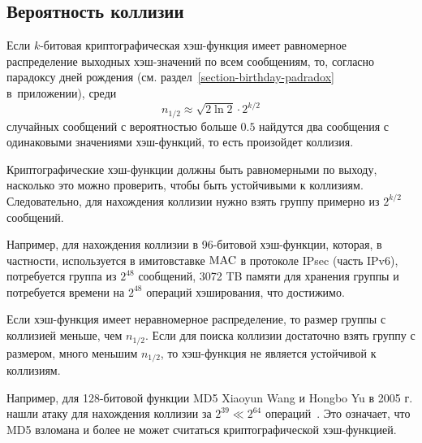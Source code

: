 \subsection{Вероятность коллизии}

Если $k$-битовая криптографическая хэш-функция имеет равномерное распределение выходных хэш-значений по всем сообщениям, то, согласно парадоксу дней рождения (см. раздел~\ref{section-birthday-padradox} в~приложении), среди
    \[ n_{1/2} \approx \sqrt{2 \ln 2} \cdot 2^{k/2} \]
случайных сообщений с вероятностью больше $0.5$ найдутся два сообщения с одинаковыми значениями хэш-функций, то есть произойдет коллизия.

Криптографические хэш-функции должны быть равномерными по выходу, насколько это можно проверить, чтобы быть устойчивыми к коллизиям. Следовательно, для нахождения коллизии нужно взять группу примерно из $2^{k/2}$ сообщений.

Например, для нахождения коллизии в 96-битовой хэш-функции, которая, в частности, используется в имитовставке $\textrm{MAC}$ в протоколе IPsec (часть IPv6), потребуется группа из $2^{48}$ сообщений, 3072 TB памяти для хранения группы и потребуется времени на $2^{48}$ операций хэширования, что достижимо.

Если хэш-функция имеет неравномерное распределение, то размер группы с коллизией меньше, чем $n_{1/2}$. Если для поиска коллизии достаточно взять группу с размером, много меньшим $n_{1/2}$, то хэш-функция не является устойчивой к коллизиям.

Например, для 128-битовой функции MD5 Xiaoyun Wang и Hongbo Yu в 2005 г. нашли атаку для нахождения коллизии за $2^{39} \ll 2^{64}$ операций~\cite{WangYu:2005}. Это означает, что MD5 взломана и более не может считаться криптографической хэш-функцией.
